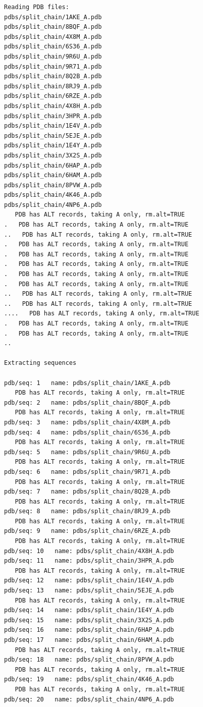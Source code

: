\documentclass[
  letterpaper,
  DIV=11,
  numbers=noendperiod]{scrartcl}
\begin{document}
\begin{verbatim}
Reading PDB files:
pdbs/split_chain/1AKE_A.pdb
pdbs/split_chain/8BQF_A.pdb
pdbs/split_chain/4X8M_A.pdb
pdbs/split_chain/6S36_A.pdb
pdbs/split_chain/9R6U_A.pdb
pdbs/split_chain/9R71_A.pdb
pdbs/split_chain/8Q2B_A.pdb
pdbs/split_chain/8RJ9_A.pdb
pdbs/split_chain/6RZE_A.pdb
pdbs/split_chain/4X8H_A.pdb
pdbs/split_chain/3HPR_A.pdb
pdbs/split_chain/1E4V_A.pdb
pdbs/split_chain/5EJE_A.pdb
pdbs/split_chain/1E4Y_A.pdb
pdbs/split_chain/3X2S_A.pdb
pdbs/split_chain/6HAP_A.pdb
pdbs/split_chain/6HAM_A.pdb
pdbs/split_chain/8PVW_A.pdb
pdbs/split_chain/4K46_A.pdb
pdbs/split_chain/4NP6_A.pdb
   PDB has ALT records, taking A only, rm.alt=TRUE
.   PDB has ALT records, taking A only, rm.alt=TRUE
..   PDB has ALT records, taking A only, rm.alt=TRUE
.   PDB has ALT records, taking A only, rm.alt=TRUE
.   PDB has ALT records, taking A only, rm.alt=TRUE
.   PDB has ALT records, taking A only, rm.alt=TRUE
.   PDB has ALT records, taking A only, rm.alt=TRUE
.   PDB has ALT records, taking A only, rm.alt=TRUE
..   PDB has ALT records, taking A only, rm.alt=TRUE
..   PDB has ALT records, taking A only, rm.alt=TRUE
....   PDB has ALT records, taking A only, rm.alt=TRUE
.   PDB has ALT records, taking A only, rm.alt=TRUE
.   PDB has ALT records, taking A only, rm.alt=TRUE
..

Extracting sequences

pdb/seq: 1   name: pdbs/split_chain/1AKE_A.pdb 
   PDB has ALT records, taking A only, rm.alt=TRUE
pdb/seq: 2   name: pdbs/split_chain/8BQF_A.pdb 
   PDB has ALT records, taking A only, rm.alt=TRUE
pdb/seq: 3   name: pdbs/split_chain/4X8M_A.pdb 
pdb/seq: 4   name: pdbs/split_chain/6S36_A.pdb 
   PDB has ALT records, taking A only, rm.alt=TRUE
pdb/seq: 5   name: pdbs/split_chain/9R6U_A.pdb 
   PDB has ALT records, taking A only, rm.alt=TRUE
pdb/seq: 6   name: pdbs/split_chain/9R71_A.pdb 
   PDB has ALT records, taking A only, rm.alt=TRUE
pdb/seq: 7   name: pdbs/split_chain/8Q2B_A.pdb 
   PDB has ALT records, taking A only, rm.alt=TRUE
pdb/seq: 8   name: pdbs/split_chain/8RJ9_A.pdb 
   PDB has ALT records, taking A only, rm.alt=TRUE
pdb/seq: 9   name: pdbs/split_chain/6RZE_A.pdb 
   PDB has ALT records, taking A only, rm.alt=TRUE
pdb/seq: 10   name: pdbs/split_chain/4X8H_A.pdb 
pdb/seq: 11   name: pdbs/split_chain/3HPR_A.pdb 
   PDB has ALT records, taking A only, rm.alt=TRUE
pdb/seq: 12   name: pdbs/split_chain/1E4V_A.pdb 
pdb/seq: 13   name: pdbs/split_chain/5EJE_A.pdb 
   PDB has ALT records, taking A only, rm.alt=TRUE
pdb/seq: 14   name: pdbs/split_chain/1E4Y_A.pdb 
pdb/seq: 15   name: pdbs/split_chain/3X2S_A.pdb 
pdb/seq: 16   name: pdbs/split_chain/6HAP_A.pdb 
pdb/seq: 17   name: pdbs/split_chain/6HAM_A.pdb 
   PDB has ALT records, taking A only, rm.alt=TRUE
pdb/seq: 18   name: pdbs/split_chain/8PVW_A.pdb 
   PDB has ALT records, taking A only, rm.alt=TRUE
pdb/seq: 19   name: pdbs/split_chain/4K46_A.pdb 
   PDB has ALT records, taking A only, rm.alt=TRUE
pdb/seq: 20   name: pdbs/split_chain/4NP6_A.pdb 
\end{verbatim}
\end{document}
